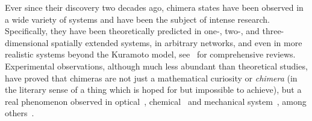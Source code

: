 Ever since their discovery two decades ago, chimera states have been observed in a wide
variety of systems and have been the subject of intense research. Specifically, they have
been theoretically predicted in one-, two-, and three-dimensional spatially extended systems,
in arbitrary networks, and even in more realistic systems beyond the Kuramoto model,
see~\cite{panaggio2015chimera,scholl2016synchronization,omelchenko2018mathematics,
haugland2021changing,majhi2019chimera,parastesh2021chimeras} for comprehensive reviews. 
Experimental observations, although much less abundant than theoretical studies, have proved
that chimeras are not just a mathematical curiosity or {\em chimera} (in the literary sense of
a thing which is hoped for but impossible to achieve), but a real phenomenon observed in
optical~\cite{hagerstrom2012experimental}, chemical~\cite{tinsley2012chimera, nkomo2013chimera,totz2018spiral} and 
mechanical system~\cite{martens2013chimera}, among others~\cite{schmidt2014coexistence, viktorov2014coherence, wickramasinghe2013spatially}.
 
